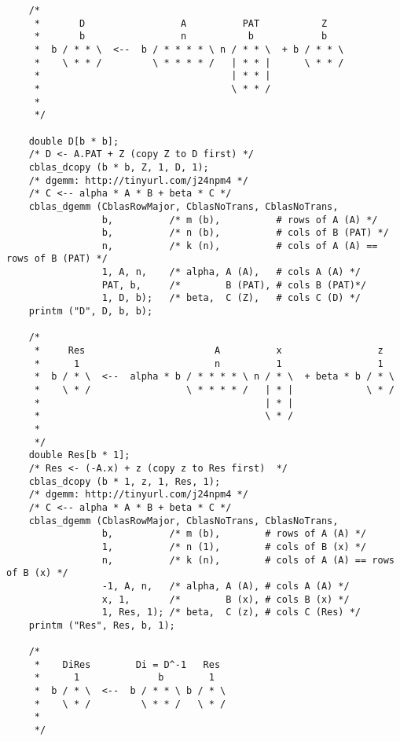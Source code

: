 \documentclass[10pt,oneside,x11names]{article}
\begin{document}
\begin{verbatim}
    /*
     *       D                 A          PAT           Z
     *       b                 n           b            b
     *  b / * * \  <--  b / * * * * \ n / * * \  + b / * * \
     *    \ * * /         \ * * * * /   | * * |      \ * * /
     *                                  | * * |
     *                                  \ * * /
     *
     */

    double D[b * b];
    /* D <- A.PAT + Z (copy Z to D first) */
    cblas_dcopy (b * b, Z, 1, D, 1);
    /* dgemm: http://tinyurl.com/j24npm4 */
    /* C <-- alpha * A * B + beta * C */
    cblas_dgemm (CblasRowMajor, CblasNoTrans, CblasNoTrans,
                 b,          /* m (b),          # rows of A (A) */
                 b,          /* n (b),          # cols of B (PAT) */
                 n,          /* k (n),          # cols of A (A) == rows of B (PAT) */
                 1, A, n,    /* alpha, A (A),   # cols A (A) */
                 PAT, b,     /*        B (PAT), # cols B (PAT)*/
                 1, D, b);   /* beta,  C (Z),   # cols C (D) */
    printm ("D", D, b, b);

    /*
     *     Res                       A          x                 z
     *      1                        n          1                 1
     *  b / * \  <--  alpha * b / * * * * \ n / * \  + beta * b / * \
     *    \ * /                 \ * * * * /   | * |             \ * /
     *                                        | * |
     *                                        \ * /
     *
     */
    double Res[b * 1];
    /* Res <- (-A.x) + z (copy z to Res first)  */
    cblas_dcopy (b * 1, z, 1, Res, 1);
    /* dgemm: http://tinyurl.com/j24npm4 */
    /* C <-- alpha * A * B + beta * C */
    cblas_dgemm (CblasRowMajor, CblasNoTrans, CblasNoTrans,
                 b,          /* m (b),        # rows of A (A) */
                 1,          /* n (1),        # cols of B (x) */
                 n,          /* k (n),        # cols of A (A) == rows of B (x) */
                 -1, A, n,   /* alpha, A (A), # cols A (A) */
                 x, 1,       /*        B (x), # cols B (x) */
                 1, Res, 1); /* beta,  C (z), # cols C (Res) */
    printm ("Res", Res, b, 1);

    /*
     *    DiRes        Di = D^-1   Res
     *      1              b        1
     *  b / * \  <--  b / * * \ b / * \
     *    \ * /         \ * * /   \ * /
     *
     */


\end{verbatim}
\end{document}

